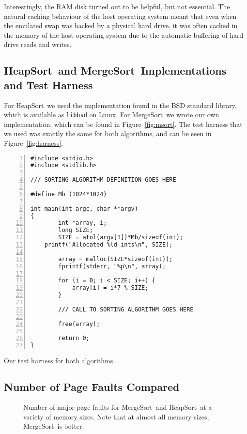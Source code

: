 \documentclass{acmtrans2m}
\newcommand{\heapsort}{{\sc HeapSort}}
\newcommand{\mergesort}{{\sc MergeSort}}
\begin{document}
Interestingly, the RAM disk turned out to be helpful, but not essential. The
natural caching behaviour of the host operating system meant that even when the
emulated swap was backed by a physical hard drive, it was often cached in the
memory of the host operating system due to the automatic buffering of hard
drive reads and writes.

\subsection{\heapsort\ and \mergesort\ Implementations and Test Harness}

For \heapsort\ we used the implementation found in the BSD standard library,
which is available as {\tt libbsd} on Linux.  For \mergesort\ we wrote our own
implementation, which can be found in Figure~\ref{fig:msort}.  The test harness
that we used was exactly the same for both algorithms, and can be seen in
Figure~\ref{fig:harness}.

\begin{narrowfig}{3in}
\begin{Verbatim}[numbers=left,numbersep=3pt,xleftmargin=20pt]
#include <stdio.h>
#include <stdlib.h>

/// SORTING ALGORITHM DEFINITION GOES HERE

#define Mb (1024*1024)

int main(int argc, char **argv)
{
        int *array, i;
        long SIZE;
        SIZE = atol(argv[1])*Mb/sizeof(int);
	printf("Allocated %ld ints\n", SIZE);

        array = malloc(SIZE*sizeof(int));
        fprintf(stderr, "%p\n", array);
        
        for (i = 0; i < SIZE; i++) {
            array[i] = i*7 % SIZE;
        }

        /// CALL TO SORTING ALGORITHM GOES HERE

        free(array);

        return 0;
}
\end{Verbatim}
\caption{Our test harness for both algorithms}
\label{fig:harness}
\end{narrowfig}

\subsection{Number of Page Faults Compared}

\begin{figure}

\caption{Number of major page faults for \mergesort\ and \heapsort\ at a variety of memory sizes.  Note that at almost all memory sizes, \mergesort\ is better.}
\end{figure}
\end{document}
